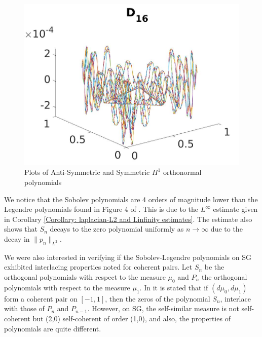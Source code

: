 \documentclass[12pt]{amsart}
\theoremstyle{plain}
\theoremstyle{definition}
\begin{document}
\begin{figure}[H]
\begin{minipage}{.3\textwidth}
    \end{minipage}
    \begin{minipage}{.3\textwidth}
    \centering
    \includegraphics[width=\textwidth]{images/H1SymmOPs0_19/Ss16.jpg}
    \end{minipage}
    
    \caption{Plots of Anti-Symmetric and Symmetric $H^1$ orthonormal polynomials}
    \label{fig: Symmetric and Antisymmetric plots}
\end{figure}

We notice that the Sobolev polynomials are 4 orders of magnitude lower than the Legendre polynomials found in Figure 4 of \cite{OST}. This is due to the $L^{\infty}$ estimate given in Corollary \ref{Corollary: laplacian-L2 and Linfinity estimates}. The estimate also shows that $S_n$ decays to the zero polynomial uniformly as $n \rightarrow \infty$ due to the decay in $\|p_n\|_{L^2}$. 

We were also interested in verifying if the Sobolev-Legendre polynomials on SG exhibited interlacing properties noted for coherent pairs. Let $S_n$ be the orthogonal polynomials with respect to the measure $\mu_0$ and $P_n$ the orthogonal polynomials with respect to the measure $\mu_1$. In \cite{MX} it is stated that if $(d\mu_0, d\mu_1)$ form a coherent pair on $[-1,1]$, then the zeros of the polynomial $S_n$, interlace with those of $P_n$ and $P_{n-1}$. However, on SG, the self-similar measure is not self-coherent but (2,0) self-coherent of order (1,0), and also, the properties of polynomials are quite different. 
\end{document}
